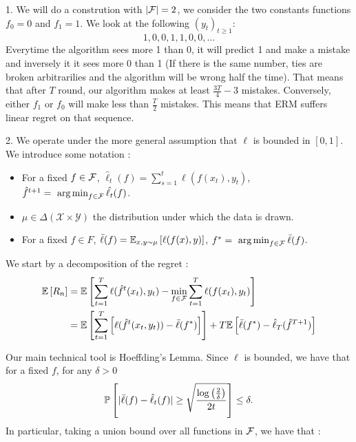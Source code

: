 \begin{solution}[]
1. We will do a constrution with $ |\F| = 2 $, we consider the two constants functions $ f_0 = 0 $ and $ f_1 = 1 $. We
look at the following $ (y_t)_{t \geq 1 }$:
\begin{equation*}
	1,0,0,1,1,0,0,\ldots
\end{equation*}
Everytime the algorithm sees more 1 than 0, it will predict 1 and make a mistake and inversely it it sees more 0 than 1
(If there is the same number, ties are broken arbitrarilies and the algorithm will be wrong half the time). That means that
after $T$ round, our algorithm makes at least $ \frac{3T}{4} - 3 $ mistakes. Conversely, either $ f_1 $ or $ f_0 $ will
make less than $ \frac{T}{2} $ mistakes. This means that ERM suffers linear regret on that sequence.
\vspace{5mm}

2. We operate under the more general assumption that $ \ell $ is bounded in $ [0,1] $. We introduce some notation :
\begin{itemize}

	\item For a fixed $ f\in \F $, $ \hat{\ell}_t(f) = \sum_{s=1}^{t} \ell(f(x_t),y_t) $, $ \hat{f}^{t+1} = \argmin_{f \in
		\F} \hat{\ell_t}(f) $.
	\item $ \mu \in \Delta(\mathcal{X}\times \mathcal{Y}) $ the distribution under which the data is drawn.
	\item For a fixed $ f\in F $, $ \bar{\ell}(f) = \EEs{\ell(f(x),y)}{x,y\sim \mu} $, $ f^{*} = \argmin_{f\in \F}
		\bar{\ell}(f) $.
\end{itemize}
We start by a decomposition of the regret :
\begin{align*}
	\EE{R_n} &= \EE{\sum_{t=1}^{T}\ell(\hat{f}^{t}(x_t),y_t) - \min_{f\in \F}\sum_{t=1}^{T}\ell(f(x_t),y_t)}\\
		 &=\EE{\sum_{t=1}^{T}\left[\ell(\hat{f}^t(x_t,y_t)) - \bar{\ell}(f^{*})\right]} + T\EE{\bar{\ell}(f^{*})-
		 \hat{\ell}_T(\hat{f}^{T+1})}
\end{align*}

Our main technical tool is Hoeffding's Lemma. Since $ \ell $ is bounded, we have that for a fixed $f$, for any $
\delta > 0 $
\begin{equation*}
	\PP{|\bar{\ell}(f) - \hat{\ell}_t(f)| \geq \sqrt{\frac{\log \left( \frac{2}{\delta} \right)}{2t}}} \leq \delta.
\end{equation*}
In particular, taking a union bound over all functions in $ \F $, we have that :


\end{solution}
